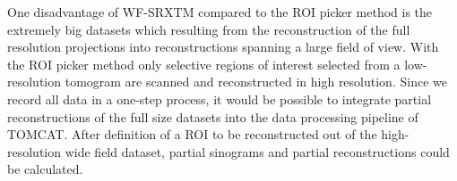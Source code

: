 One disadvantage of WF-SRXTM compared to the ROI picker method is the extremely big datasets which resulting from the reconstruction of the full resolution projections into reconstructions spanning a large field of view. With the ROI picker method only selective regions of interest selected from a low-resolution tomogram are scanned and reconstructed in high resolution. Since we record all data in a one-step process, it would be possible to integrate partial reconstructions of the full size datasets into the data processing pipeline of TOMCAT. After definition of a ROI to be reconstructed out of the high-resolution wide field dataset, partial sinograms and partial reconstructions could be calculated.